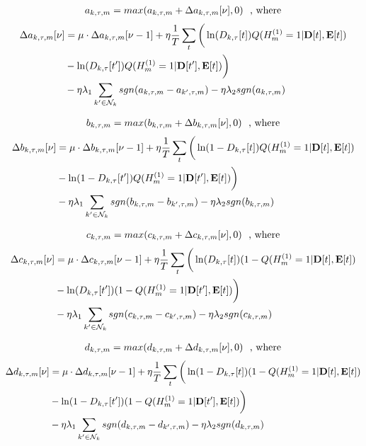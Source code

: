 \begin{align*}
a_{k,\tau,m} = max( a_{k,\tau,m} + \Delta a_{k,\tau,m}[\nu], 0) \textrm{\,\,\,\,, where}
\end{align*}
\begin{align*}
\Delta a_{k,\tau,m}[\nu] & = \mu \cdot \Delta a_{k,\tau,m}[\nu-1] + \eta \frac{1}{T}\sum\limits_t \bigg( \ln(D_{k,\tau}[t]) Q( H_m^{(1)} = 1 | \mathbf{D}[t], \mathbf{E}[t] ) \\
     								  				  &-\ln(D_{k,\tau}[t']) Q( H_m^{(1)} = 1 | \mathbf{D}[t'], \mathbf{E}[t] ) \bigg) \\
& - \eta \lambda_1 \sum\limits_{k' \in \mathcal{N}_k} sgn( a_{k,\tau,m} - a_{k',\tau,m} ) - \eta \lambda_2 sgn( a_{k,\tau,m} ) \\
\end{align*}

\begin{align*}
b_{k,\tau,m} = max( b_{k,\tau,m} + \Delta b_{k,\tau,m}[\nu], 0) \textrm{\,\,\,\,, where}
\end{align*}
\begin{align*}
\Delta b_{k,\tau,m}[\nu] &= \mu \cdot \Delta b_{k,\tau,m}[\nu-1] + \eta \frac{1}{T}\sum\limits_t  \bigg( \ln(1-D_{k,\tau}[t]) Q( H_m^{(1)} = 1 | \mathbf{D}[t], \mathbf{E}[t] ) \\
     								  				  &-\ln(1-D_{k,\tau}[t']) Q( H_m^{(1)} = 1 | \mathbf{D}[t'], \mathbf{E}[t] ) \bigg) \\
& - \eta \lambda_1 \sum\limits_{k' \in \mathcal{N}_k} sgn( b_{k,\tau,m} - b_{k',\tau,m} ) - \eta \lambda_2 sgn( b_{k,\tau,m} )  \\
\end{align*}

\begin{align*}
c_{k,\tau,m} = max( c_{k,\tau,m} + \Delta c_{k,\tau,m}[\nu], 0) \textrm{\,\,\,\,, where}
\end{align*}
\begin{align*}
\Delta c_{k,\tau,m}[\nu] &= \mu \cdot \Delta c_{k,\tau,m}[\nu-1] + \eta \frac{1}{T}\sum\limits_t  \bigg( \ln(D_{k,\tau}[t]) (1-Q( H_m^{(1)} = 1 | \mathbf{D}[t], \mathbf{E}[t] ) \\
     								  				  &-\ln(D_{k,\tau}[t']) (1-Q( H_m^{(1)} = 1 | \mathbf{D}[t'], \mathbf{E}[t] ) \bigg) \\
& - \eta \lambda_1 \sum\limits_{k' \in \mathcal{N}_k} sgn( c_{k,\tau,m} - c_{k',\tau,m} ) - \eta \lambda_2 sgn( c_{k,\tau,m} )  \\
\end{align*}

\begin{align*}
d_{k,\tau,m} = max( d_{k,\tau,m} + \Delta d_{k,\tau,m}[\nu], 0) \textrm{\,\,\,\,, where}
\end{align*}
\begin{align*}
\Delta d_{k,\tau,m}[\nu] &= \mu \cdot \Delta d_{k,\tau,m}[\nu-1] + \eta\frac{1}{T}\sum\limits_t  \bigg( \ln(1-D_{k,\tau}[t]) (1-Q( H_m^{(1)} = 1 | \mathbf{D}[t], \mathbf{E}[t] ) \\     								  				  &-\ln(1-D_{k,\tau}[t']) (1-Q( H_m^{(1)} = 1 | \mathbf{D}[t'], \mathbf{E}[t] ) \bigg) \\
& - \eta \lambda_1 \sum\limits_{k' \in \mathcal{N}_k} sgn( d_{k,\tau,m} - d_{k',\tau,m} ) -\eta \lambda_2 sgn( d_{k,\tau,m} )  \\
\end{align*}


